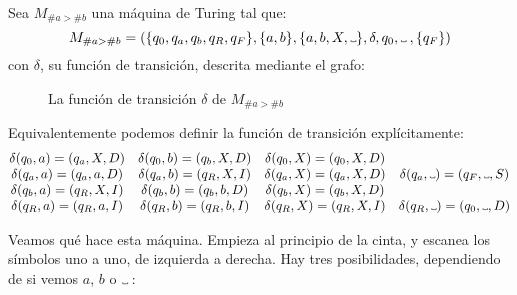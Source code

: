 \begin{ejemplo}\label{ej:mt-1}Sea $M_{\#a>\#b}$ una máquina de Turing tal que:
$$
    M_{\#a>\#b}=(\{q_0, q_a, q_b, q_R, q_F\}, \{a, b\}, \{a, b, X, \Vtextvisiblespace\}, \delta, q_0, \Vtextvisiblespace\:,\{q_F\})
$$
con $\delta$, su función de transición, descrita mediante el grafo:
\vfill
\begin{figure}[H]
\centering
\resizebox{.7\linewidth}{!}{}
\caption{La función de transición $\delta$ de $M_{\#a>\#b}$}
\label{fig:ejemplo-grafo}
\end{figure}
\vfill
\pagebreak
Equivalentemente podemos definir la función de transición explícitamente:
$$
    \begin{matrix}
        \delta(q_0, a) = (q_a,X,D) & \delta(q_0, b) = (q_b,X,D) & \delta(q_0, X) = (q_0,X,D) &  \\
        \delta(q_a, a) = (q_a,a,D) & \delta(q_a, b) = (q_R,X,I) & \delta(q_a, X) = (q_a,X,D) & \delta(q_a, \Vtextvisiblespace) = (q_F,\Vtextvisiblespace,S) \\
        \delta(q_b, a) = (q_R,X,I) & \delta(q_b, b) = (q_b,b,D) & \delta(q_b, X) = (q_b,X,D) &  \\
        \delta(q_R, a) = (q_R,a,I) & \delta(q_R, b) = (q_R,b,I) & \delta(q_R, X) = (q_R,X,I) & \delta(q_R, \Vtextvisiblespace) = (q_0,\Vtextvisiblespace,D) \\
    \end{matrix}
$$


Veamos qué hace esta máquina. Empieza al principio de la cinta, y escanea los símbolos uno a uno, de izquierda a derecha. Hay tres posibilidades, dependiendo de si vemos $a$, $b$ o $\Vtextvisiblespace\:$:


\end{ejemplo}
